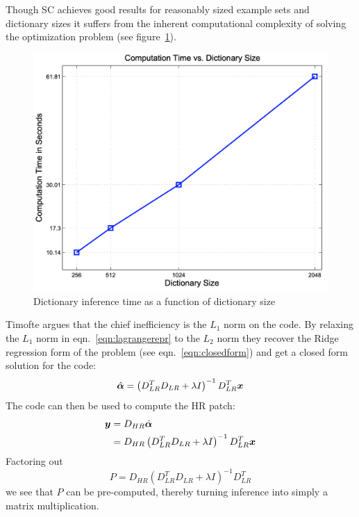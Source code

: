 Though SC achieves good results for reasonably sized example sets and dictionary sizes it suffers from the inherent computational complexity of solving the optimization problem (see figure~\ref{fig:dictspeedspize}).
\begin{figure}
    \centering
    \includegraphics[width=\linewidth,keepaspectratio]{figures/dictsizespeed.png}
    \caption{Dictionary inference time as a function of dictionary size\cite{yang2010}}
    \label{fig:dictspeedspize}
\end{figure}
%
Timofte \etal\cite{Timofte} argues that the chief inefficiency is the $L_1$ norm on the code.
%
By relaxing the $L_1$ norm in eqn.~\ref{eqn:lagrangerepr} to the $L_2$ norm they recover the Ridge regression form of the problem (see eqn.~\ref{eqn:closedform}) and get a closed form solution for the code:
\begin{equation}
    \hat{\bm{\alpha}} = \left( D_{LR}^T D_{LR} + \lambda I\right)^{-1}D_{LR}^T \bm{x}
\end{equation}
The code can then be used to compute the HR patch:
\begin{align}
    \by &= D_{HR} \hat{\bm{\alpha}} \\
    &= D_{HR} \left( D_{LR}^T D_{LR} + \lambda I\right)^{-1}D_{LR}^T \label{eqn:mappinglr}\bx
\end{align}
Factoring out
\begin{equation}
    P = D_{HR} \left( D_{LR}^T D_{LR} + \lambda I\right)^{-1}D_{LR}^T
\end{equation}
we see that $P$ can be pre-computed, thereby turning inference into simply a matrix multiplication.
